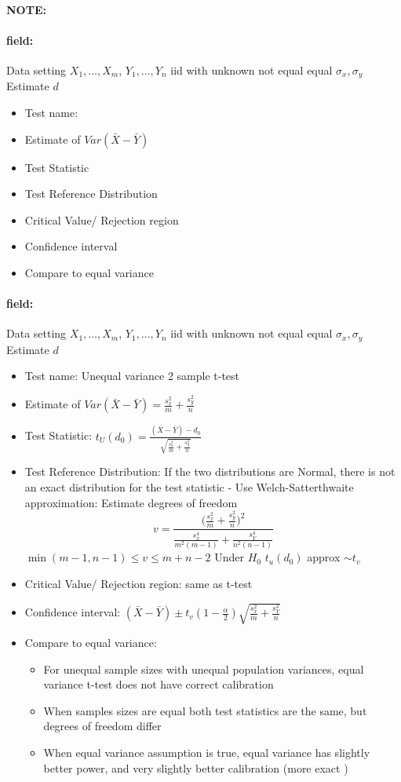 \documentclass[12pt]{article}
\newenvironment{note}{\paragraph{NOTE:}}{}
\newenvironment{field}{\paragraph{field:}}{}
\begin{document}
\begin{note}
 \begin{field}
  Data setting $X_1, \ldots , X_m$, $Y_1, \ldots, Y_n$ iid with unknown not equal equal  $\sigma_x, \sigma_y$ Estimate $d$
  \begin{itemize}
   \item Test name:
   \item Estimate of $Var(\bar{X} - \bar{Y})$
   \item Test Statistic
   \item Test Reference Distribution
   \item Critical Value/ Rejection region
   \item Confidence interval
   \item Compare to equal variance
  \end{itemize}
 \end{field}
 \begin{field}
  Data setting $X_1, \ldots , X_m$, $Y_1, \ldots, Y_n$ iid with unknown not equal equal  $\sigma_x, \sigma_y$ Estimate $d$
  \begin{itemize}
   \item Test name: Unequal variance 2 sample t-test
   \item Estimate of $Var(\bar{X} - \bar{Y}) = \frac{s_x^2}{m} + \frac{s_y^2}{n}$
   \item Test Statistic: $t_U(d_0) = \frac{(\bar{X} - \bar{Y}) - d_0}{\sqrt{\frac{s_x^2}{m} + \frac{s_y^2}{n}}}$
   \item Test Reference Distribution: If the two distributions are Normal, there is not an exact distribution for the test statistic -  Use Welch-Satterthwaite approximation: Estimate degrees of freedom
         $$ v = \frac{\big(\frac{s_x^2}{m} + \frac{s_y^2}{n}\big)^2}{\frac{s_x^4}{m^2(m-1)} + \frac{s_Y^4}{n^2(n-1)}}$$
         $\min(m-1,n-1) \leq v \leq m+n-2$
         Under $H_0$ $t_u(d_0) $ approx $\sim t_{v}$
   \item Critical Value/ Rejection region: same as t-test
   \item Confidence interval: $(\bar{X} - \bar{Y}) \pm t_v(1 - \frac{\alpha}{2})\sqrt{\frac{s_x^2}{m} + \frac{s_Y^2}{n}}$
   \item Compare to equal variance:
         \begin{itemize}
          \item For unequal sample sizes with unequal population variances, equal variance t-test does not have correct calibration
          \item When samples sizes are equal both test statistics are the same, but degrees of freedom differ
          \item When equal variance assumption is true, equal variance has slightly better power, and very slightly better calibration (more exact )
         \end{itemize}
  \end{itemize}
 \end{field}
\end{note}
\end{document}
